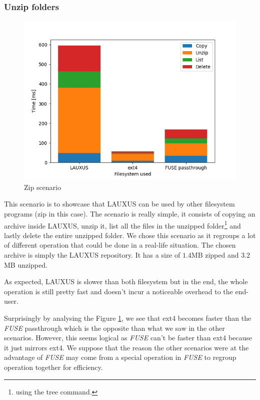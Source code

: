 \documentclass[../main.tex]{subfiles}
\begin{document}
\subsubsection{Unzip folders}%
\label{section:analysis:zip}
\begin{figure}[h]
    \centering
    \includegraphics[width=.8\textwidth]{images/analysis/zip}
    
    \caption{Zip scenario}
    \label{figure:analysis:zip}
\end{figure}
\par This scenario is to showcase that LAUXUS can be used by other filesystem programs (zip in this case). The scenario is really simple, it consists of copying an archive inside LAUXUS, unzip it, list all the files in the unzipped folder\footnote{using the tree command.} and lastly delete the entire unzipped folder. We chose this scenario as it regroups a lot of different operation that could be done in a real-life situation. The chosen archive is simply the LAUXUS repository. It has a size of $1.4$MB zipped and $3.2$MB unzipped.
\par As expected, LAUXUS is slower than both filesystem but in the end, the whole operation is still pretty fast and doesn't incur a noticeable overhead to the end-user.
\par Surprisingly by analysing the Figure \ref{figure:analysis:zip}, we see that ext4 becomes faster than the \textit{FUSE} passthrough which is the opposite than what we saw in the other scenarios. However, this seems logical as \textit{FUSE} can't be faster than ext4 because it just mirrors ext4. We suppose that the reason the other scenarios were at the advantage of \textit{FUSE} may come from a special operation in \textit{FUSE} to regroup operation together for efficiency.
\end{document}
